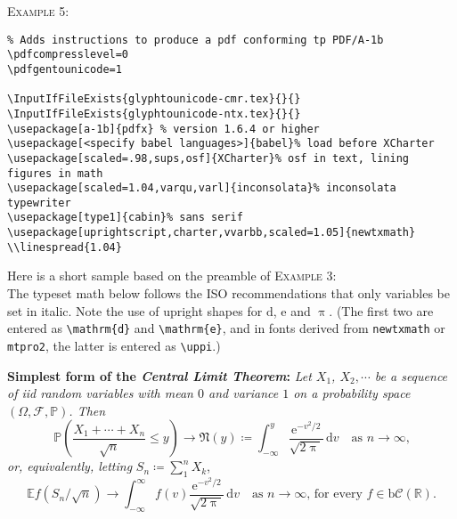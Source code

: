 \documentclass[11pt]{article}
\begin{document}
\textsc{Example 5:}
\begin{verbatim}
% Adds instructions to produce a pdf conforming tp PDF/A-1b
\pdfcompresslevel=0
\pdfgentounicode=1 
 
\InputIfFileExists{glyphtounicode-cmr.tex}{}{} 
\InputIfFileExists{glyphtounicode-ntx.tex}{}{}
\usepackage[a-1b]{pdfx} % version 1.6.4 or higher
\usepackage[<specify babel languages>]{babel}% load before XCharter
\usepackage[scaled=.98,sups,osf]{XCharter}% osf in text, lining figures in math
\usepackage[scaled=1.04,varqu,varl]{inconsolata}% inconsolata typewriter
\usepackage[type1]{cabin}% sans serif
\usepackage[uprightscript,charter,vvarbb,scaled=1.05]{newtxmath}
\\linespread{1.04}
\end{verbatim}


Here is a short sample based on the preamble of \textsc{Example 3}:\\[4pt]
\def\Pr{\ensuremath{\mathbb{P}}}
\def\rmd{\mathrm{d}}
The typeset math below follows the ISO recommendations that only variables
be set in italic. Note the use of upright shapes for $\rmd$, $\mathrm{e}$
and $\uppi$. (The first two are entered as \verb|\mathrm{d}| and
\verb|\mathrm{e}|, and in fonts derived from {\tt newtxmath} or {\tt mtpro2},
 the latter is entered as \verb|\uppi|.)

\textbf{Simplest form of the \textit{Central Limit Theorem}:} \textit{Let
$X_1$, $X_2,\cdots$ be a sequence of iid random variables with mean $0$ 
and variance $1$ on a probability space $(\Omega,\mathcal{F},\Pr)$. Then}
\[\Pr\left(\frac{X_1+\cdots+X_n}{\sqrt{n}}\le y\right)\to\mathfrak{N}(y)\coloneq
\int_{-\infty}^y \frac{\mathrm{e}^{-v^2/2}}{\sqrt{2\uppi}}\,
\mathrm{d}v\quad\mbox{as $n\to\infty$,}\]
\textit{or, equivalently, letting} $S_n\coloneq\sum_1^n X_k$,
\[\mathbb{E} f\left(S_n/\sqrt{n}\right)\to \int_{-\infty}^\infty f(v)
\frac{\mathrm{e}^{-v^2/2}}{\sqrt{2\uppi}}\,\mathrm{d}v
\quad\mbox{as $n\to\infty$, for every $f\in\mathrm{b}
\mathcal{C}(\mathbb{R})$.}\]

\def\testupgreek{%
  \test\Gamma \test\Delta 
  \test\Theta \test\Lambda \test\Xi \test\Pi \test\Sigma
  \test\Upsilon \test\Phi \test\Psi \test\Omega }
\end{document}
